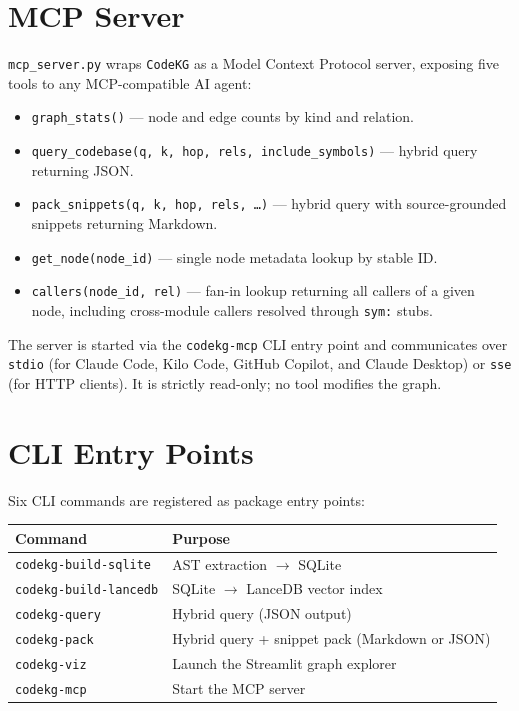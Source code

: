\documentclass[10pt]{article}
\begin{document}
\section{MCP Server}

\texttt{mcp\_server.py} wraps \texttt{CodeKG} as a Model Context Protocol server,
exposing five tools to any MCP-compatible AI agent:

\begin{itemize}
\item \texttt{graph\_stats()} --- node and edge counts by kind and relation.
\item \texttt{query\_codebase(q, k, hop, rels, include\_symbols)} --- hybrid query
returning JSON.
\item \texttt{pack\_snippets(q, k, hop, rels, \ldots)} --- hybrid query with
source-grounded snippets returning Markdown.
\item \texttt{get\_node(node\_id)} --- single node metadata lookup by stable ID.
\item \texttt{callers(node\_id, rel)} --- fan-in lookup returning all callers of a
given node, including cross-module callers resolved through \texttt{sym:} stubs.
\end{itemize}

The server is started via the \texttt{codekg-mcp} CLI entry point and communicates
over \texttt{stdio} (for Claude Code, Kilo Code, GitHub Copilot, and Claude
Desktop) or \texttt{sse} (for HTTP clients). It is strictly read-only; no tool
modifies the graph.

\section{CLI Entry Points}

Six CLI commands are registered as package entry points:

\begin{center}
\begin{tabular}{ll}
\toprule
Command & Purpose \\
\midrule
\texttt{codekg-build-sqlite} & AST extraction $\to$ SQLite \\
\texttt{codekg-build-lancedb} & SQLite $\to$ LanceDB vector index \\
\texttt{codekg-query} & Hybrid query (JSON output) \\
\texttt{codekg-pack} & Hybrid query + snippet pack (Markdown or JSON) \\
\texttt{codekg-viz} & Launch the Streamlit graph explorer \\
\texttt{codekg-mcp} & Start the MCP server \\
\bottomrule
\end{tabular}
\end{center}
\end{document}

